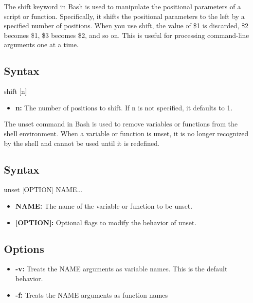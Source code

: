 \documentclass{report}
\begin{document}
    \pagebreak 
    \bigbreak \noindent 
    The shift keyword in Bash is used to manipulate the positional parameters of a script or function. Specifically, it shifts the positional parameters to the left by a specified number of positions. When you use shift, the value of \$1 is discarded, \$2 becomes \$1, \$3 becomes \$2, and so on. This is useful for processing command-line arguments one at a time.
    \bigbreak \noindent 
    \subsection{Syntax}
    \bigbreak \noindent 
    \begin{bashcode}
    shift [n]
    \end{bashcode}
    \begin{itemize}
        \item \textbf{n:} The number of positions to shift. If n is not specified, it defaults to 1.
    \end{itemize}

    \pagebreak 
    \bigbreak \noindent 
    The unset command in Bash is used to remove variables or functions from the shell environment. When a variable or function is unset, it is no longer recognized by the shell and cannot be used until it is redefined.
    \bigbreak \noindent 
    \subsection{Syntax}
    \bigbreak \noindent 
    \begin{bashcode}
    unset [OPTION] NAME...
    \end{bashcode}
    \begin{itemize}
        \item \textbf{NAME:} The name of the variable or function to be unset.
        \item \textbf{[OPTION]:} Optional flags to modify the behavior of unset.
    \end{itemize}
    \bigbreak \noindent 
    \subsection{Options}
    \begin{itemize}
        \item \textbf{-v:} Treats the NAME arguments as variable names. This is the default behavior.
        \item \textbf{-f:} Treats the NAME arguments as function names
    \end{itemize}
    \bigbreak \noindent 
\end{document}

